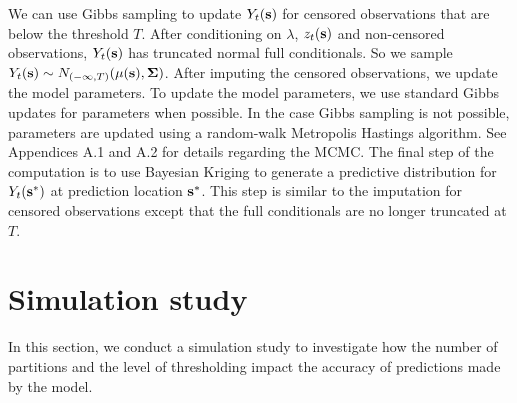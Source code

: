 \documentclass[11pt]{article}
\begin{document}
We can use Gibbs sampling to update $Y_t(\mbox{\bf s})$ for censored observations that are below the threshold $T$.
After conditioning on $\lambda$, $z_t(\mbox{\bf s})$ and non-censored observations, $Y_t(\mbox{\bf s})$ has truncated normal full conditionals.
So we sample $Y_t(\mbox{\bf s}) \sim N_{(-\infty, T)}(\mu(\mbox{\bf s}), \mbox{\boldmath $\Sigma$})$.
After imputing the censored observations, we update the model parameters.
To update the model parameters, we use standard Gibbs updates for parameters when possible.
In the case Gibbs sampling is not possible, parameters are updated using a random-walk Metropolis Hastings algorithm.
See Appendices A.1 and A.2 for details regarding the MCMC.
The final step of the computation is to use Bayesian Kriging to generate a predictive distribution for $Y_t(\mbox{\bf s}^*)$ at prediction location $\mbox{\bf s}^*$.
This step is similar to the imputation for censored observations except that the full conditionals are no longer truncated at $T$.

\section{Simulation study}\label{s:simstudy}
In this section, we conduct a simulation study to investigate how the number of partitions and the level of thresholding impact the accuracy of predictions made by the model.
\end{document}
